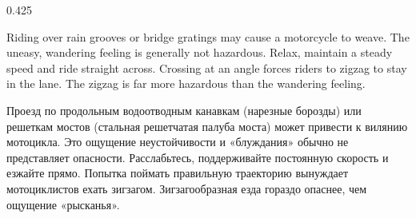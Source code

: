 \begin{langblock}{0.425}
	\begin{eng}
	
	Riding over rain grooves or bridge gratings may cause a motorcycle to weave. The uneasy, wandering feeling is generally not hazardous. Relax, maintain a steady speed and ride straight across. Crossing at an angle forces riders to zigzag to stay in the lane. The zigzag is far more hazardous than the wandering feeling.
	\end{eng}
	\begin{rus}
		
		Проезд по продольным водоотводным канавкам (нарезные борозды) или решеткам мостов (стальная решетчатая палуба моста) может привести к вилянию мотоцикла. Это ощущение неустойчивости и «блуждания» обычно не представляет опасности. Расслабьтесь, поддерживайте постоянную скорость и езжайте прямо. Попытка поймать правильную траекторию вынуждает мотоциклистов ехать зигзагом. Зигзагообразная езда гораздо опаснее, чем ощущение «рысканья».
\end{rus}
\end{langblock}









